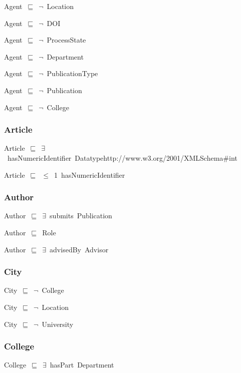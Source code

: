 \documentclass{article}
\begin{document}
Agent~\ensuremath{\sqsubseteq}~\ensuremath{\lnot}~Location

Agent~\ensuremath{\sqsubseteq}~\ensuremath{\lnot}~DOI

Agent~\ensuremath{\sqsubseteq}~\ensuremath{\lnot}~ProcessState

Agent~\ensuremath{\sqsubseteq}~\ensuremath{\lnot}~Department

Agent~\ensuremath{\sqsubseteq}~\ensuremath{\lnot}~PublicationType

Agent~\ensuremath{\sqsubseteq}~\ensuremath{\lnot}~Publication

Agent~\ensuremath{\sqsubseteq}~\ensuremath{\lnot}~College

\subsubsection*{Article}

Article~\ensuremath{\sqsubseteq}~\ensuremath{\exists}~hasNumericIdentifier~Datatypehttp://www.w3.org/2001/XMLSchema#int~

Article~\ensuremath{\sqsubseteq}~\ensuremath{\leq}~1~hasNumericIdentifier~

\subsubsection*{Author}

Author~\ensuremath{\sqsubseteq}~\ensuremath{\exists}~submits~Publication~

Author~\ensuremath{\sqsubseteq}~Role~

Author~\ensuremath{\sqsubseteq}~\ensuremath{\exists}~advisedBy~Advisor~

\subsubsection*{City}

City~\ensuremath{\sqsubseteq}~\ensuremath{\lnot}~College

City~\ensuremath{\sqsubseteq}~\ensuremath{\lnot}~Location

City~\ensuremath{\sqsubseteq}~\ensuremath{\lnot}~University

\subsubsection*{College}

College~\ensuremath{\sqsubseteq}~\ensuremath{\exists}~hasPart~Department~
\end{document}
